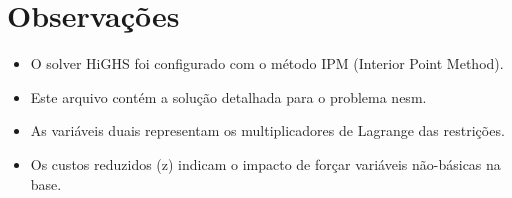 \documentclass[12pt]{article}
\begin{document}
\section{Observações}

\begin{itemize}
\item O solver HiGHS foi configurado com o método IPM (Interior Point Method).
\item Este arquivo contém a solução detalhada para o problema nesm.
\item As variáveis duais representam os multiplicadores de Lagrange das restrições.
\item Os custos reduzidos (z) indicam o impacto de forçar variáveis não-básicas na base.
\end{itemize}
\end{document}
